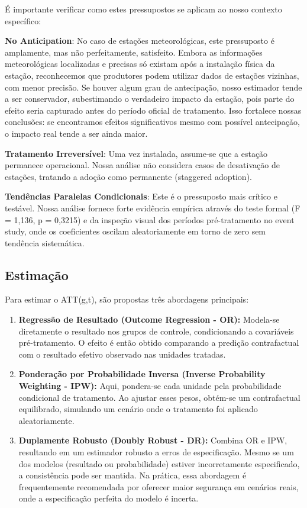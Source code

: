 \documentclass[
	12pt,				%
	oneside,			%
	a4paper,			%
	english,			%
	french,				%
	spanish,			%
	brazil				%
	]{abntex2}
\begin{document}
É importante verificar como estes pressupostos se aplicam ao nosso contexto específico:

\textbf{No Anticipation}: No caso de estações meteorológicas, este pressuposto é amplamente, mas não perfeitamente, satisfeito. Embora as informações meteorológicas localizadas e precisas só existam após a instalação física da estação, reconhecemos que produtores podem utilizar dados de estações vizinhas, com menor precisão. Se houver algum grau de antecipação, nosso estimador tende a ser conservador, subestimando o verdadeiro impacto da estação, pois parte do efeito seria capturado antes do período oficial de tratamento. Isso fortalece nossas conclusões: se encontramos efeitos significativos mesmo com possível antecipação, o impacto real tende a ser ainda maior.

\textbf{Tratamento Irreversível}: Uma vez instalada, assume-se que a estação permanece operacional. Nossa análise não considera casos de desativação de estações, tratando a adoção como permanente (staggered adoption).

\textbf{Tendências Paralelas Condicionais}: Este é o pressuposto mais crítico e testável. Nossa análise fornece forte evidência empírica através do teste formal (F = 1,136, p = 0,3215) e da inspeção visual dos períodos pré-tratamento no event study, onde os coeficientes oscilam aleatoriamente em torno de zero sem tendência sistemática.

\subsection{Estimação}

Para estimar o ATT(g,t), são propostas três abordagens principais:

\begin{enumerate}
\item \textbf{Regressão de Resultado (Outcome Regression - OR):} Modela-se diretamente o resultado nos grupos de controle, condicionando a covariáveis pré-tratamento. O efeito é então obtido comparando a predição contrafactual com o resultado efetivo observado nas unidades tratadas.

\item \textbf{Ponderação por Probabilidade Inversa (Inverse Probability Weighting - IPW):} Aqui, pondera-se cada unidade pela probabilidade condicional de tratamento. Ao ajustar esses pesos, obtém-se um contrafactual equilibrado, simulando um cenário onde o tratamento foi aplicado aleatoriamente.

\item \textbf{Duplamente Robusto (Doubly Robust - DR):} Combina OR e IPW, resultando em um estimador robusto a erros de especificação. Mesmo se um dos modelos (resultado ou probabilidade) estiver incorretamente especificado, a consistência pode ser mantida. Na prática, essa abordagem é frequentemente recomendada por oferecer maior segurança em cenários reais, onde a especificação perfeita do modelo é incerta.
\end{enumerate}
\end{document}
